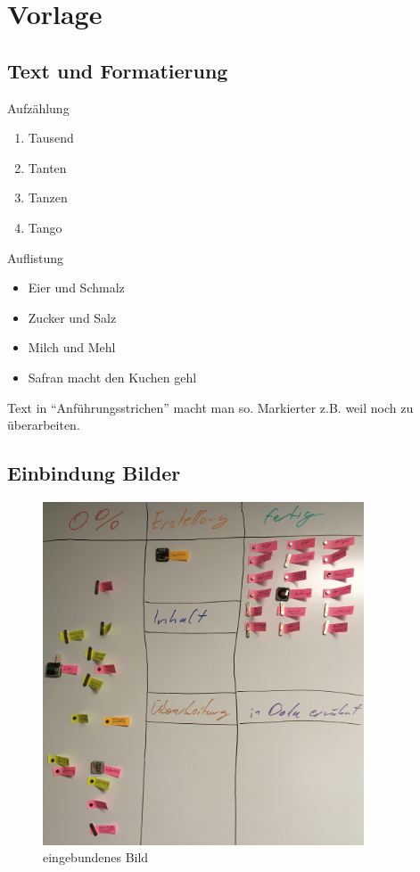 \chapter{Vorlage}
\section{Text und Formatierung}
Aufzählung
\begin{enumerate}
\item Tausend
\item Tanten
\item Tanzen
\item Tango
\end{enumerate}

Auflistung
\begin{itemize}
\item{Eier und Schmalz}
\item{Zucker und Salz}
\item{Milch und Mehl}
\item{Safran macht den Kuchen gehl}
\end{itemize}

Text in \enquote{Anführungsstrichen} macht man so. Markierter  z.B. weil noch zu überarbeiten.

\section{Einbindung Bilder}

\begin{figure}[h]
	\centering
	\includegraphics[width=0.85\textwidth]{./pics/kanban.jpg}
	\caption{eingebundenes Bild}
\end{figure}

